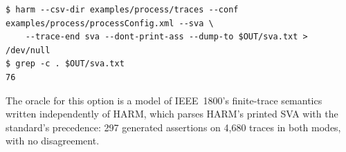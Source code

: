 \begin{lstlisting}
$ harm --csv-dir examples/process/traces --conf examples/process/processConfig.xml --sva \
    --trace-end sva --dont-print-ass --dump-to $OUT/sva.txt > /dev/null
$ grep -c . $OUT/sva.txt
76
\end{lstlisting}

The oracle for this option is a model of IEEE~1800's finite-trace semantics written independently of HARM, which parses HARM's printed SVA with the standard's precedence: 297 generated assertions on 4{,}680 traces in both modes, with no disagreement.
